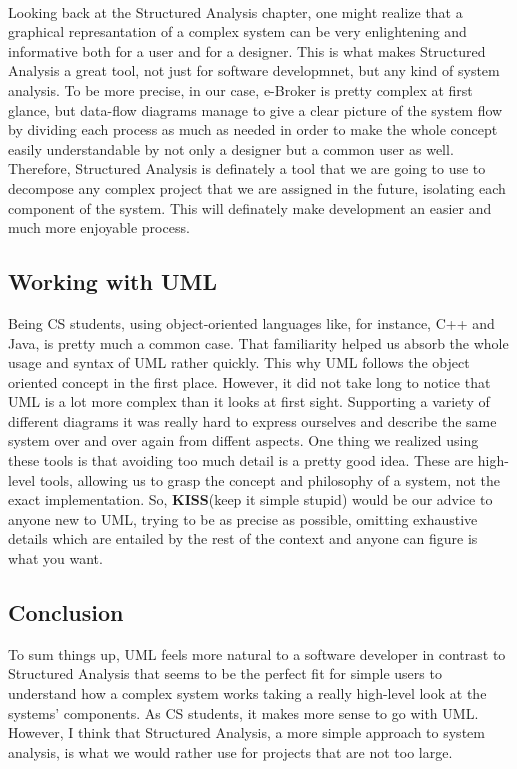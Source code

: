 \documentclass{article}
\begin{document}
\paragraph{}
Looking back at the Structured Analysis chapter, one might realize that
a graphical represantation of a complex system can be very enlightening and informative both for
a user and for a designer. This is what makes Structured Analysis a great tool, not just for software developmnet, but any
kind of system analysis. To be more precise, in our case, e-Broker is pretty complex at first glance,
but data-flow diagrams manage
to give a clear picture of the system flow by dividing each process as much as needed in order to make the whole concept
easily understandable by not only a designer but a common user as well. Therefore, Structured Analysis is definately a tool
that we are going to use to decompose any complex project that we are assigned in the future, isolating each component of
the system. This will definately make development an easier and much more enjoyable process. 

\subsection{Working with UML}
Being CS students, using object-oriented languages like, for instance, C++ and Java, is pretty much a common case.
That familiarity helped us absorb the whole usage and syntax of UML rather quickly. This why UML follows the
object oriented concept in the first place. However, it did not take long to notice that UML is a lot more
complex than it looks at first sight. Supporting a variety of different diagrams it was really hard to
express ourselves and describe the same system over and over again from diffent aspects.
One thing we realized using these tools is that avoiding too much detail is a
pretty good idea. These are high-level tools, allowing us to grasp the concept and philosophy of a system, not
the exact implementation. So, \textbf{KISS}(keep it simple stupid) would be our advice to anyone new to UML,
trying to be as precise as possible, omitting exhaustive details which are entailed by the rest of the context
and anyone can figure is what you want. 
 

\subsection{Conclusion}
To sum things up, UML feels more natural to a software developer in contrast to Structured Analysis that seems
to be the perfect fit for simple users to understand how a complex system works taking a really high-level look
at the systems' components. As CS students, it makes more sense to go with UML. However, I think that Structured Analysis,
a more simple approach to system analysis, is what we would rather use for projects that are not too large.
\end{document}
